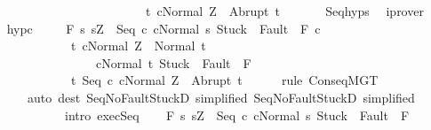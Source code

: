 \begin{isabellebody}
\ \ \ \ \ \ \ \ \ \ \ \ \ \ \ \ \ \ \ \ \ \ \ \ \ \ {\isacharbraceleft}t{\isachardot}\ {\isasymGamma}{\isasymturnstile}{\isasymlangle}c{}{\isacharcomma}Normal\ Z{\isasymrangle}\ {\isasymRightarrow}\ Abrupt\ t{\isacharbraceright}{\isachardoublequoteclose}\ \isanewline
\ \ \ \ \isamarkupfalse%
\ Seq{\isachardot}hyps\ \isamarkupfalse%
\ iprover\isanewline
\ \ \isamarkupfalse%
\ hyp{\isacharunderscore}c{}\ \isanewline
\ \ \isamarkupfalse%
\ {\isachardoublequoteopen}{\isasymGamma}{\isacharcomma}{\isasymTheta}{\isasymturnstile}\isactrlbsub {\isacharslash}F\isactrlesub \ {\isacharbraceleft}s{\isachardot}\ s{\isacharequal}Z\ {\isasymand}\ {\isasymGamma}{\isasymturnstile}{\isasymlangle}Seq\ c{}\ c{}{\isacharcomma}Normal\ s{\isasymrangle}\ {\isasymRightarrow}{\isasymnotin}{\isacharparenleft}{\isacharbraceleft}Stuck{\isacharbraceright}\ {\isasymunion}\ Fault\ {\isacharbackquote}\ {\isacharparenleft}{\isacharminus}F{\isacharparenright}{\isacharparenright}{\isacharbraceright}\ c{}\ \isanewline
\ \ \ \ \ \ \ \ \ \ \ \ \ \ {\isacharbraceleft}t{\isachardot}\ {\isasymGamma}{\isasymturnstile}{\isasymlangle}c{}{\isacharcomma}Normal\ Z{\isasymrangle}\ {\isasymRightarrow}\ Normal\ t\ {\isasymand}\ \isanewline
\ \ \ \ \ \ \ \ \ \ \ \ \ \ \ \ \ \ {\isasymGamma}{\isasymturnstile}{\isasymlangle}c{}{\isacharcomma}Normal\ t{\isasymrangle}\ {\isasymRightarrow}{\isasymnotin}{\isacharparenleft}{\isacharbraceleft}Stuck{\isacharbraceright}\ {\isasymunion}\ Fault\ {\isacharbackquote}\ {\isacharparenleft}{\isacharminus}F{\isacharparenright}{\isacharparenright}{\isacharbraceright}{\isacharcomma}\isanewline
\ \ \ \ \ \ \ \ \ \ \ \ \ \ {\isacharbraceleft}t{\isachardot}\ {\isasymGamma}{\isasymturnstile}{\isasymlangle}Seq\ c{}\ c{}{\isacharcomma}Normal\ Z{\isasymrangle}\ {\isasymRightarrow}\ Abrupt\ t{\isacharbraceright}{\isachardoublequoteclose}\isanewline
\ \ \ \ \isamarkupfalse%
\ {\isacharparenleft}rule\ ConseqMGT{\isacharparenright}\isanewline
\ \ \ \ \ \ \ {\isacharparenleft}auto\ dest{\isacharcolon}\ Seq{\isacharunderscore}NoFaultStuckD{}\ {\isacharbrackleft}simplified{\isacharbrackright}\ Seq{\isacharunderscore}NoFaultStuckD{}\ {\isacharbrackleft}simplified{\isacharbrackright}\isanewline
\ \ \ \ \ \ \ \ \ \ \ \ \ intro{\isacharcolon}\ exec{\isachardot}Seq{\isacharparenright}\isanewline
\ \ \isamarkupfalse%
\ {\isachardoublequoteopen}{\isasymGamma}{\isacharcomma}{\isasymTheta}{\isasymturnstile}\isactrlbsub {\isacharslash}F\isactrlesub \ {\isacharbraceleft}s{\isachardot}\ s{\isacharequal}Z\ {\isasymand}\ {\isasymGamma}{\isasymturnstile}{\isasymlangle}Seq\ c{}\ c{}{\isacharcomma}Normal\ s{\isasymrangle}\ {\isasymRightarrow}{\isasymnotin}{\isacharparenleft}{\isacharbraceleft}Stuck{\isacharbraceright}\ {\isasymunion}\ Fault\ {\isacharbackquote}\ {\isacharparenleft}{\isacharminus}F{\isacharparenright}{\isacharparenright}{\isacharbraceright}\ \isanewline

\end{isabellebody}
